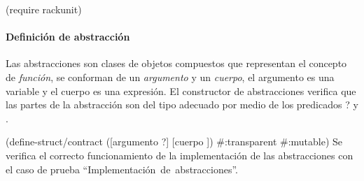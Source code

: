 \documentclass[letterpaper, twoside, openright, 11pt]{book}%
\begin{document}
\nwenddocs{}\endmoddef\nwstartdeflinemarkup{}\nwenddeflinemarkup
(require rackunit)
\nwendcode{}\nwdocspar

\paragraph{Definición de abstracción} Las abstracciones son clases de objetos compuestos que representan el concepto de \emph{función}, se conforman de un \emph{argumento} y un \emph{cuerpo}, el argumento es una variable y el cuerpo es una expresión. El constructor de abstracciones verifica que las partes de la abstracción son del tipo adecuado por medio de los predicados {\Tt{}?\nwendquote} y {\Tt{}\nwendquote}.

\nwenddocs{}\endmoddef\nwstartdeflinemarkup{}\nwenddeflinemarkup
(define-struct/contract 
  ([argumento ?] [cuerpo ])
  #:transparent
  #:mutable)
\eatline
{}\nwendcode{}\nwdocspar
Se verifica el correcto funcionamiento de la implementación de las abstracciones con el caso de prueba ``{\Tt{}Implementación\ de\ abstracciones\nwendquote}''.
\end{document}
